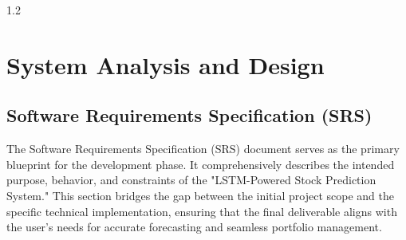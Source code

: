 \documentclass[12pt, a4paper]{report}
\begin{document}
\begin{spacing}{1.2}

\chapter{System Analysis and Design}
\section{Software Requirements Specification (SRS)} The Software Requirements Specification (SRS) document serves as the primary blueprint for the development phase. It comprehensively describes the intended purpose, behavior, and constraints of the "LSTM-Powered Stock Prediction System." This section bridges the gap between the initial project scope and the specific technical implementation, ensuring that the final deliverable aligns with the user's needs for accurate forecasting and seamless portfolio management.


\end{spacing}
\end{document}
